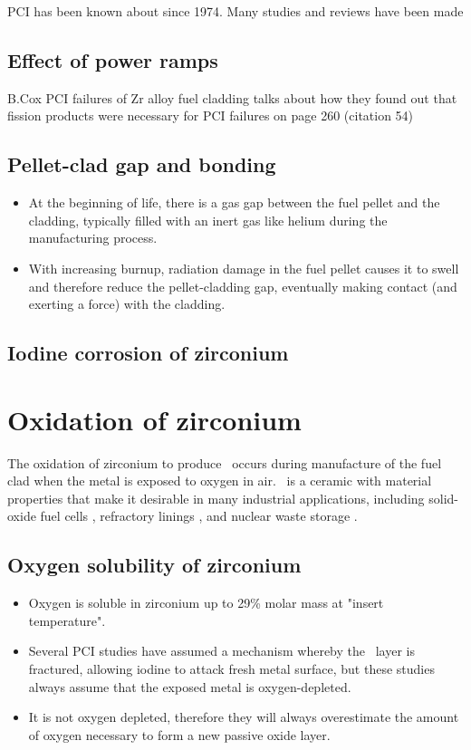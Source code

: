 PCI has been known about since 1974. Many studies and reviews have been made \cite{alam2011review}

\subsection{Effect of power ramps}
B.Cox PCI failures of Zr alloy fuel cladding \cite{bcoxpelletclad1990} talks about how they found out that fission products were necessary for PCI failures on page 260 (citation 54)

\subsection{Pellet-clad gap and bonding}

\begin{itemize}
\item At the beginning of life, there is a gas gap between the fuel pellet and the cladding, typically filled with an inert gas like helium during the manufacturing process.
\item With increasing burnup, radiation damage in the fuel pellet causes it to swell and therefore reduce the pellet-cladding gap, eventually making contact (and exerting a force) with the cladding.
\end{itemize}

\subsection{Iodine corrosion of zirconium}

\section{Oxidation of zirconium}

The oxidation of zirconium to produce \zirconia\ occurs during manufacture of the fuel clad when the metal is exposed to oxygen in air. \zirconia\ is a ceramic with material properties that make it desirable in many industrial applications, including solid-oxide fuel cells \cite{radford1979zirconia}, refractory linings \cite{whittemore1952fused}, and nuclear waste storage \cite{wang2012ceramics}.

\subsection{Oxygen solubility of zirconium}

\begin{itemize}
\item Oxygen is soluble in zirconium up to 29\% molar mass at "insert temperature".
\item Several PCI studies have assumed a mechanism whereby the \zirconia\ layer is fractured, allowing iodine to attack fresh metal surface, but these studies always assume that the exposed metal is oxygen-depleted.
\item It is not oxygen depleted, therefore they will always overestimate the amount of oxygen necessary to form a new passive oxide layer.
\end{itemize}

